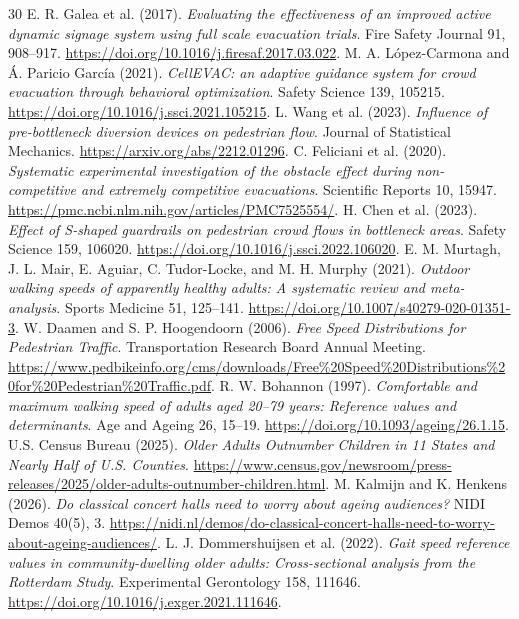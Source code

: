 \documentclass[11pt,a4paper]{article}
\begin{document}
\begin{thebibliography}{30}
 E. R. Galea et al. (2017). \emph{Evaluating the effectiveness of an improved active dynamic signage system using full scale evacuation trials}. Fire Safety Journal 91, 908--917. \url{https://doi.org/10.1016/j.firesaf.2017.03.022}.
 M. A. L\'opez-Carmona and \'A. Paricio Garc\'ia (2021). \emph{CellEVAC: an adaptive guidance system for crowd evacuation through behavioral optimization}. Safety Science 139, 105215. \url{https://doi.org/10.1016/j.ssci.2021.105215}.
 L. Wang et al. (2023). \emph{Influence of pre-bottleneck diversion devices on pedestrian flow}. Journal of Statistical Mechanics. \url{https://arxiv.org/abs/2212.01296}.
 C. Feliciani et al. (2020). \emph{Systematic experimental investigation of the obstacle effect during non-competitive and extremely competitive evacuations}. Scientific Reports 10, 15947. \url{https://pmc.ncbi.nlm.nih.gov/articles/PMC7525554/}.
 H. Chen et al. (2023). \emph{Effect of S-shaped guardrails on pedestrian crowd flows in bottleneck areas}. Safety Science 159, 106020. \url{https://doi.org/10.1016/j.ssci.2022.106020}.
 E. M. Murtagh, J. L. Mair, E. Aguiar, C. Tudor-Locke, and M. H. Murphy (2021). \emph{Outdoor walking speeds of apparently healthy adults: A systematic review and meta-analysis}. Sports Medicine 51, 125--141. \url{https://doi.org/10.1007/s40279-020-01351-3}.
 W. Daamen and S. P. Hoogendoorn (2006). \emph{Free Speed Distributions for Pedestrian Traffic}. Transportation Research Board Annual Meeting. \url{https://www.pedbikeinfo.org/cms/downloads/Free%20Speed%20Distributions%20for%20Pedestrian%20Traffic.pdf}.
 R. W. Bohannon (1997). \emph{Comfortable and maximum walking speed of adults aged 20--79 years: Reference values and determinants}. Age and Ageing 26, 15--19. \url{https://doi.org/10.1093/ageing/26.1.15}.
 U.S. Census Bureau (2025). \emph{Older Adults Outnumber Children in 11 States and Nearly Half of U.S. Counties}. \url{https://www.census.gov/newsroom/press-releases/2025/older-adults-outnumber-children.html}.
 M. Kalmijn and K. Henkens (2026). \emph{Do classical concert halls need to worry about ageing audiences?} NIDI Demos 40(5), 3. \url{https://nidi.nl/demos/do-classical-concert-halls-need-to-worry-about-ageing-audiences/}.
 L. J. Dommershuijsen et al. (2022). \emph{Gait speed reference values in community-dwelling older adults: Cross-sectional analysis from the Rotterdam Study}. Experimental Gerontology 158, 111646. \url{https://doi.org/10.1016/j.exger.2021.111646}.

\end{thebibliography}
\end{document}
